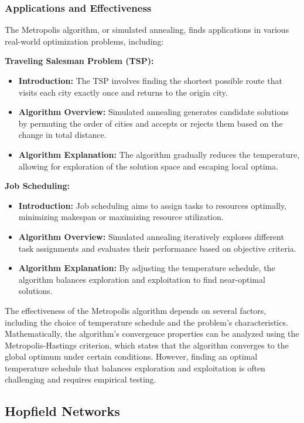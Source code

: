 \documentclass[12pt]{book} %
\begin{document}
\subsubsection{Applications and Effectiveness}

The Metropolis algorithm, or simulated annealing, finds applications in various real-world optimization problems, including:

\textbf{Traveling Salesman Problem (TSP):}
\begin{itemize}
    \item \textbf{Introduction:} The TSP involves finding the shortest possible route that visits each city exactly once and returns to the origin city.
    \item \textbf{Algorithm Overview:} Simulated annealing generates candidate solutions by permuting the order of cities and accepts or rejects them based on the change in total distance.
    \item \textbf{Algorithm Explanation:} The algorithm gradually reduces the temperature, allowing for exploration of the solution space and escaping local optima.
\end{itemize}

\textbf{Job Scheduling:}
\begin{itemize}
    \item \textbf{Introduction:} Job scheduling aims to assign tasks to resources optimally, minimizing makespan or maximizing resource utilization.
    \item \textbf{Algorithm Overview:} Simulated annealing iteratively explores different task assignments and evaluates their performance based on objective criteria.
    \item \textbf{Algorithm Explanation:} By adjusting the temperature schedule, the algorithm balances exploration and exploitation to find near-optimal solutions.
\end{itemize}


The effectiveness of the Metropolis algorithm depends on several factors, including the choice of temperature schedule and the problem's characteristics. Mathematically, the algorithm's convergence properties can be analyzed using the Metropolis-Hastings criterion, which states that the algorithm converges to the global optimum under certain conditions. However, finding an optimal temperature schedule that balances exploration and exploitation is often challenging and requires empirical testing.

\subsection{Hopfield Networks}
\end{document}

